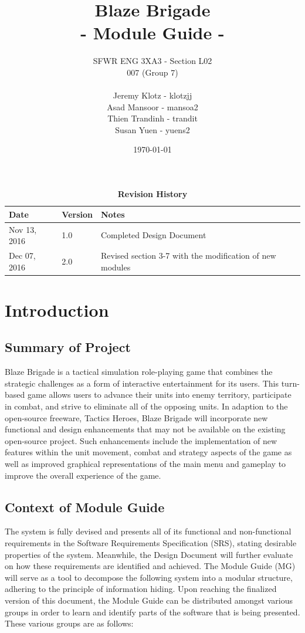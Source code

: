 \documentclass{article}
\title{
    \vspace{40mm}
	\textbf {
	\Huge {\color[rgb]{0.9,0,0}Blaze} Brigade \\
	\large - Module Guide -}}
\date{\today}
\author{SFWR ENG 3XA3 - Section L02 \\
	007 (Group 7) \\ \\
	Jeremy Klotz - klotzjj \\
	Asad Mansoor - mansoa2 \\
	Thien Trandinh - trandit \\
	Susan Yuen - yuens2}
\begin{document}
\maketitle
{}
\newpage
{}

\tableofcontents
\listoftables
\listoffigures

\newpage 
\begin{table}[bp]
    \caption{\bf Revision History}
    \begin{tabularx}{\textwidth}{p{3cm}p{2cm}X}
        \toprule {\bf Date} & {\bf Version} & {\bf Notes} \\
        \midrule
        Nov 13, 2016 & 1.0 & Completed Design Document \\
        Dec 07, 2016 & 2.0 & Revised section 3-7 with the modification of new modules \\
        \bottomrule
    \end{tabularx}
\end{table}
 
\hfill \break


\newpage

\section{Introduction}

\subsection{Summary of Project}
Blaze Brigade is a tactical simulation role-playing game that combines the strategic challenges as a form of interactive entertainment for its users. This turn-based game allows users to advance their units into enemy territory, participate in combat, and strive to eliminate all of the opposing units. In adaption to the open-source freeware, Tactics Heroes, Blaze Brigade will incorporate new functional and design enhancements that may not be available on the existing open-source project. Such enhancements include the implementation of new features within the unit movement, combat and strategy aspects of the game as well as improved graphical representations of the main menu and gameplay to improve the overall experience of the game.

\subsection{Context of Module Guide}
The system is fully devised and presents all of its functional and non-functional requirements in the Software Requirements Specification (SRS), stating desirable properties of the system. Meanwhile, the Design Document will further evaluate on how these requirements are identified and achieved. The Module Guide (MG) will serve as a tool to decompose the following system into a modular structure, adhering to the principle of information hiding. Upon reaching the finalized version of this document, the Module Guide can be distributed amongst various groups in order to learn and identify parts of the software that is being presented. These various groups are as follows:
\end{document}
